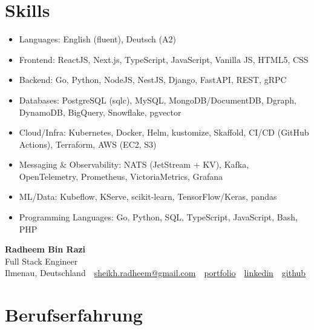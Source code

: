 \documentclass[10pt,a4paper]{resume}
\makeatletter
\newcommand{\Portfolio}{https://radheem.github.io/my-cv}
\newcommand{\PortfolioText}{portfolio}
\newcommand{\GitHub}{https://github.com/radheem}
\newcommand{\LinkedIn}{https://www.linkedin.com/in/radheem-razi}
\newcommand{\Email}{sheikh.radheem@gmail.com}
\makeatother
\begin{document}
\section{Skills}

\begin{itemize}[leftmargin=1.4em,nosep,topsep=2pt]
  \item Languages: English (fluent), Deutsch (A2)
  \item Frontend: ReactJS, Next.js, TypeScript, JavaScript, Vanilla JS, HTML5, CSS
  \item Backend: Go, Python, NodeJS, NestJS, Django, FastAPI, REST, gRPC
  \item Databases: PostgreSQL (sqlc), MySQL, MongoDB/DocumentDB, Dgraph, DynamoDB, BigQuery, Snowflake, pgvector
  \item Cloud/Infra: Kubernetes, Docker, Helm, kustomize, Skaffold, CI/CD (GitHub Actions), Terraform, AWS (EC2, S3)
  \item Messaging \& Observability: NATS (JetStream + KV), Kafka, OpenTelemetry, Prometheus, VictoriaMetrics, Grafana
  \item ML/Data: Kubeflow, KServe, scikit-learn, TensorFlow/Keras, pandas
  \item Programming Languages: Go, Python, SQL, TypeScript, JavaScript, Bash, PHP
\end{itemize}

\clearpage
{}

\begin{center}
  {\huge\bfseries Radheem Bin Razi}\\[3pt]
  {\large Full Stack Engineer}\\[6pt]
  \small
  Ilmenau, Deutschland \,\textbar\,
  \href{mailto:\Email}{\Email} \,\textbar\,
  \href{\Portfolio}{\PortfolioText} \,\textbar\,
  \href{\LinkedIn}{linkedin} \,\textbar\,
  \href{\GitHub}{github}
\end{center}
\vspace{2pt}

\section{Berufserfahrung}
\end{document}
